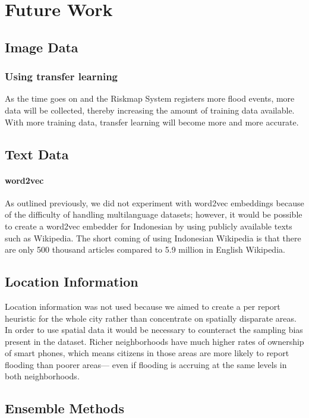 \chapter{Future Work}

\section{Image Data}
\subsection{Using transfer learning}
As the time goes on and the Riskmap System registers more flood events, 
more data will be collected, thereby increasing the amount of training data 
available. With more training data, transfer learning will become more and 
more accurate.

\section{Text Data}
\subsubsection{word2vec}
As outlined previously, we did not experiment with word2vec embeddings because
of the difficulty of handling multilanguage datasets; however, it would be
possible to create a word2vec embedder for Indonesian by using publicly
available texts such as Wikipedia. The short coming of using Indonesian Wikipedia 
is that there are only 500 thousand articles compared to 5.9 million in English Wikipedia.

\section{Location Information}
Location information was not used because we aimed to create a per report heuristic 
for the whole city rather than concentrate on spatially disparate areas. In order 
to use spatial data it would be necessary to counteract the sampling bias present
in the dataset. Richer neighborhoods have much higher rates of ownership of smart phones,
which means citizens in those areas are more likely to report flooding than poorer
areas--- even if flooding is accruing at the same levels in both neighborhoods.

\section{Ensemble Methods}

